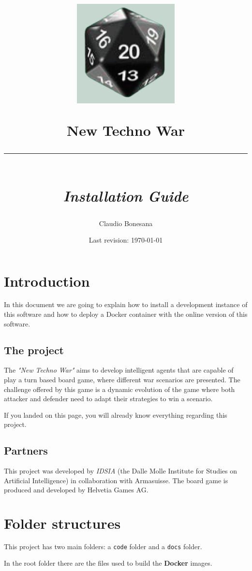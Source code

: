 \documentclass[a4paper]{article}
\author{Claudio Bonesana}
\title{
	\begin{center}
		\includegraphics[width=0.4\textwidth]{dice.png}
    \end{center}
    \Large New Techno War \\
	\rule{10cm}{0.3mm} \\
	\large \textit{Installation Guide} \\
}
\date{Last revision: \today}
\begin{document}
	
	\maketitle
	


	\section{Introduction}

	In this document we are going to explain how to install a development instance of this software and how to deploy a Docker container with the online version of this software.

	\subsection{The project}

	The \textit{"New Techno War"} aims to develop intelligent agents that are capable of play a turn based board game, where different war scenarios are presented. The challenge offered by this game is a dynamic evolution of the game where both attacker and defender need to adapt their strategies to win a scenario.

	If you landed on this page, you will already know everything regarding this project.

	\subsection{Partners}

	This project was developed by \textit{IDSIA} (the Dalle Molle Institute for Studies on Artificial Intelligence) in collaboration with Armasuisse. The board game is produced and developed by Helvetia Games AG.


	\section{Folder structures}

	This project has two main folders: a \texttt{code} folder and a \texttt{docs} folder.

	In the root folder there are the files used to build the \textbf{Docker} images.
\end{document}
